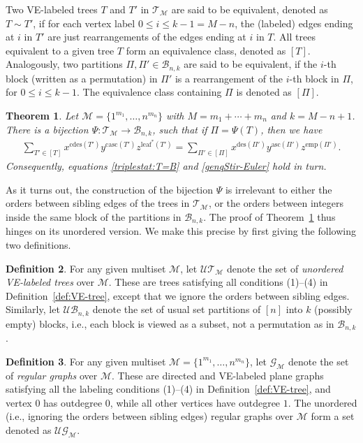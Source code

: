 \documentclass[11pt,reqno]{amsart}
\numberwithin{equation}{section}
\theoremstyle{plain}
\newtheorem{theorem}{Theorem}[section]
\theoremstyle{definition}
\newtheorem{Def}[theorem]{Definition}
\newcommand{\M}{\mathcal{M}}
\newcommand{\T}{\mathcal{T}}
\newcommand{\B}{\mathcal{B}}
\newcommand{\G}{\mathcal{G}}
\newcommand{\UT}{\mathcal{UT}}
\newcommand{\UB}{\mathcal{UB}}
\newcommand{\UG}{\mathcal{UG}}
\def\des{\mathrm{des}}
\def\asc{\mathrm{asc}}
\def\cdes{\mathrm{cdes}}
\def\casc{\mathrm{casc}}
\def\lleaf{\mathrm{leaf}^*}
\def\emp{\mathrm{emp}}
\begin{document}
Two VE-labeled trees $T$ and $T'$ in $\T_{\M}$ are said to be equivalent, denoted as $T\sim T'$, if for each vertex label $0\le i\le k-1=M-n$, the (labeled) edges ending at $i$ in $T'$ are just rearrangements of the edges ending at $i$ in $T$. All trees equivalent to a given tree $T$ form an equivalence class, denoted as $[T]$. Analogously, two partitions $\Pi,\Pi'\in\B_{n,k}$ are said to be equivalent, if the $i$-th block (written as a permutation) in $\Pi'$ is a rearrangement of the $i$-th block in $\Pi$, for $0\le i\le k-1$. The equivalence class containing $\Pi$ is denoted as $[\Pi]$.

\begin{theorem}\label{thm:FL}
Let $\M=\{1^{m_1},\ldots,n^{m_n}\}$ with $M=m_1+\cdots+m_n$ and $k=M-n+1$. There is a bijection $\Psi:\T_{\M}\rightarrow \B_{n,k}$, such that if $\Pi=\Psi(T)$, then we have
\begin{align}\label{eq:triple stat equiv}
\sum_{T'\in[T]}x^{\cdes(T')}y^{\casc(T')}z^{\lleaf(T')}=\sum_{\Pi'\in[\Pi]}x^{\des(\Pi')}y^{\asc(\Pi')}z^{\emp(\Pi')}.
\end{align}
Consequently, equations \eqref{triplestat:T=B} and \eqref{genqStir-Euler} hold in turn.
\end{theorem}

As it turns out, the construction of the bijection $\Psi$ is irrelevant to either the orders between sibling edges of the trees in $\T_{\M}$, or the orders between integers inside the same block of the partitions in $\B_{n,k}$. The proof of Theorem~\ref{thm:FL} thus hinges on its unordered version. We make this precise by first giving the following two definitions.
\begin{Def}
For any given multiset $\M$, let $\UT_{\M}$ denote the set of {\em unordered VE-labeled trees} over $\M$. These are trees satisfying all conditions (1)--(4) in Definition~\ref{def:VE-tree}, except that we ignore the orders between sibling edges. Similarly, let $\UB_{n,k}$ denote the set of usual set partitions of $[n]$ into $k$ (possibly empty) blocks, i.e., each block is viewed as a subset, not a permutation as in $\B_{n,k}$.
\end{Def}

\begin{Def}
For any given multiset $\M=\{1^{m_1},\ldots,n^{m_n}\}$, let $\G_{\M}$ denote the set of {\em regular graphs} over $\M$. These are directed and VE-labeled plane graphs satisfying all the labeling conditions (1)--(4) in Definition~\ref{def:VE-tree}, and vertex $0$ has outdegree $0$, while all other vertices have outdegree $1$. The unordered (i.e., ignoring the orders between sibling edges) regular graphs over $\M$ form a set denoted as $\UG_{\M}$.
\end{Def}
\end{document}
